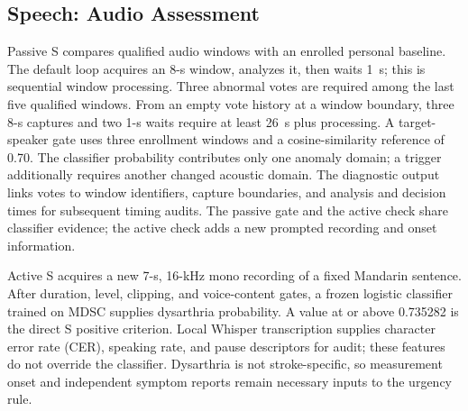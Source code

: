 \subsection{Speech: Audio Assessment}
Passive S compares qualified audio windows with an enrolled personal baseline.
The default loop acquires an 8-s window, analyzes it, then waits 1~s; this is
sequential window processing. Three abnormal votes are required among the last
five qualified windows. From an empty vote history at a window boundary, three
8-s captures and two 1-s waits require at least 26~s plus processing.
A target-speaker gate uses three enrollment windows and a cosine-similarity
reference of 0.70. The classifier probability contributes only one anomaly domain; a
trigger additionally requires another changed acoustic domain. The diagnostic
output links votes to window identifiers, capture boundaries, and analysis and
decision times for subsequent timing audits. The passive gate and the active check share classifier evidence; the active
check adds a new prompted recording and onset information.

Active S acquires a new 7-s, 16-kHz mono recording of a fixed Mandarin sentence.
After duration, level, clipping, and voice-content gates, a frozen logistic
classifier trained on MDSC supplies dysarthria probability. A value at or above 0.735282
is the direct S positive criterion. Local Whisper transcription supplies
character error rate (CER), speaking rate, and pause descriptors for audit; these
features do not override the classifier. Dysarthria is not stroke-specific,
so measurement onset and independent symptom reports remain necessary inputs
to the urgency rule.
